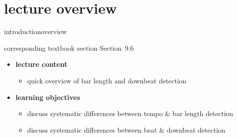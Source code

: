 


\subtitle{Module 9.6: Downbeat and Bar Length Detection}


	

    \section[overview]{lecture overview}
        \begin{frame}{introduction}{overview}
            \begin{block}{corresponding textbook section}
                    Section~9.6
            \end{block}

            \begin{itemize}
                \item   \textbf{lecture content}
                    \begin{itemize}
                        \item   quick overview of bar length and downbeat detection
                    \end{itemize}
                \bigskip
                \item<2->   \textbf{learning objectives}
                    \begin{itemize}
                        \item   discuss systematic differences between tempo \& bar length detection
                        \item   discuss systematic differences between beat \& downbeat detection
                    \end{itemize}
            \end{itemize}
        \end{frame}

